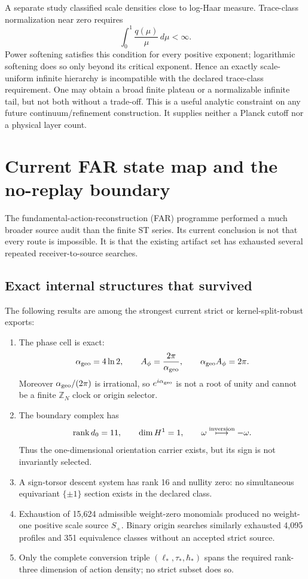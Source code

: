 \documentclass[11pt,a4paper]{article}
\theoremstyle{definition}
\theoremstyle{remark}
\newcommand{\Z}{\mathbb Z}
\begin{document}
A separate study classified scale densities close to log-Haar measure. Trace-class normalization near zero requires
\[
\int_0^1 \frac{q(\mu)}{\mu}\,d\mu<\infty.
\]
Power softening satisfies this condition for every positive exponent; logarithmic softening does so only beyond its critical exponent. Hence an exactly scale-uniform infinite hierarchy is incompatible with the declared trace-class requirement. One may obtain a broad finite plateau or a normalizable infinite tail, but not both without a trade-off. This is a useful analytic constraint on any future continuum/refinement construction. It supplies neither a Planck cutoff nor a physical layer count.

\section{Current FAR state map and the no-replay boundary}

The fundamental-action-reconstruction (FAR) programme performed a much broader source audit than the finite ST series. Its current conclusion is not that every route is impossible. It is that the existing artifact set has exhausted several repeated receiver-to-source searches.

\subsection{Exact internal structures that survived}

The following results are among the strongest current strict or kernel-split-robust exports:

\begin{enumerate}
\item The phase cell is exact:
\[
\alpha_{\rm geo}=4\ln2,\qquad
A_\phi=\frac{2\pi}{\alpha_{\rm geo}},\qquad
\alpha_{\rm geo}A_\phi=2\pi.
\]
Moreover $\alpha_{\rm geo}/(2\pi)$ is irrational, so $e^{i\alpha_{\rm geo}}$ is not a root of unity and cannot be a finite $\Z_N$ clock or origin selector.

\item The boundary complex has
\[
\operatorname{rank}d_0=11,
\qquad \dim H^1=1,
\qquad \omega\stackrel{\rm inversion}{\longmapsto}-\omega.
\]
Thus the one-dimensional orientation carrier exists, but its sign is not invariantly selected.

\item A sign-torsor descent system has rank 16 and nullity zero: no simultaneous equivariant $\{\pm1\}$ section exists in the declared class.

\item Exhaustion of 15,624 admissible weight-zero monomials produced no weight-one positive scale source $S_+$. Binary origin searches similarly exhausted 4,095 profiles and 351 equivalence classes without an accepted strict source.

\item Only the complete conversion triple $(\ell_*,\tau_*,\hbar_*)$ spans the required rank-three dimension of action density; no strict subset does so.
\end{enumerate}
\end{document}
